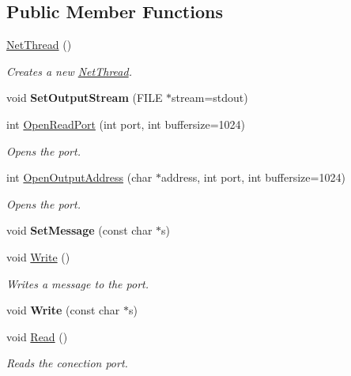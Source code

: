 \subsection*{Public Member Functions}
\begin{DoxyCompactItemize}
\item 
\hyperlink{class_net_thread_a4020c297c2b25730e046ce1a3608510f}{Net\+Thread} ()
\begin{DoxyCompactList}\small\item\em Creates a new \hyperlink{class_net_thread}{Net\+Thread}. \end{DoxyCompactList}\item 
\mbox{\label{class_net_thread_a099bee52f72de55ce912575788740707}} 
void {\bfseries Set\+Output\+Stream} (F\+I\+LE $\ast$stream=stdout)
\item 
int \hyperlink{class_net_thread_a3b51d5da0cf27b5c59c91da22b859312}{Open\+Read\+Port} (int port, int buffersize=1024)
\begin{DoxyCompactList}\small\item\em Opens the port. \end{DoxyCompactList}\item 
int \hyperlink{class_net_thread_ac7b31cfc2b1694765fb2c8c17d776f78}{Open\+Output\+Address} (char $\ast$address, int port, int buffersize=1024)
\begin{DoxyCompactList}\small\item\em Opens the port. \end{DoxyCompactList}\item 
\mbox{\label{class_net_thread_a488569dcffdf1056209aa8c2cd87d499}} 
void {\bfseries Set\+Message} (const char $\ast$s)
\item 
void \hyperlink{class_net_thread_a214ab68ced0017705fee382f38bf9fb7}{Write} ()
\begin{DoxyCompactList}\small\item\em Writes a message to the port. \end{DoxyCompactList}\item 
\mbox{\label{class_net_thread_aa4522291d843403e24edf38f806b4f29}} 
void {\bfseries Write} (const char $\ast$s)
\item 
void \hyperlink{class_net_thread_af3ea97a668d6e42d4ab7b81e6d126414}{Read} ()
\begin{DoxyCompactList}\small\item\em Reads the conection port. \end{DoxyCompactList}\item 

\end{DoxyCompactItemize}
